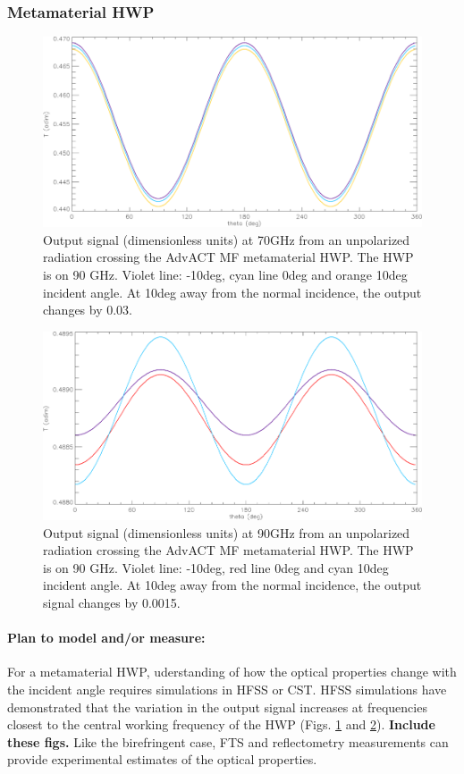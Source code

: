\subsubsection{Metamaterial HWP}

\begin{figure}
\centering
\includegraphics[width=0.6\linewidth]{figures/meta1.png}
\caption{Output signal (dimensionless units) at 70GHz from an unpolarized radiation crossing the AdvACT MF metamaterial HWP. The HWP is %
on 90 GHz. Violet line: -10deg, cyan line 0deg and orange 10deg incident angle. At 10deg away from the normal incidence, the output %
changes by 0.03.}\label{meta1}
\end{figure}

\begin{figure}
\centering
\includegraphics[width=0.6\linewidth]{figures/meta2.png}
\caption{Output signal (dimensionless units) at 90GHz from an unpolarized radiation crossing the AdvACT MF metamaterial HWP. The HWP is %
on 90 GHz. Violet line: -10deg, red line 0deg and cyan 10deg incident angle. At 10deg away from the normal incidence, the output signal
changes by 0.0015.}\label{meta2}
\end{figure}

\paragraph{Plan to model and/or measure:}
For a metamaterial HWP, uderstanding of how the optical properties change with the incident angle requires simulations in HFSS or CST. HFSS simulations have demonstrated that the variation in the output signal increases at frequencies closest to the central working frequency of the
HWP (Figs. \ref{meta1} and \ref{meta2}). \textbf{Include these figs.}
Like the birefringent case, FTS and reflectometry measurements can provide experimental estimates of the optical properties.

